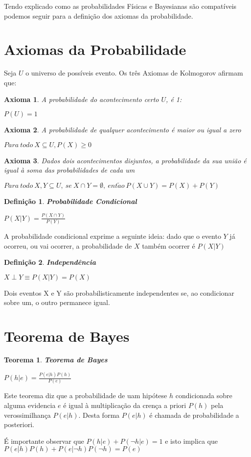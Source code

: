 Tendo explicado como as probabilidades Físicas e Bayesianas são compatíveis podemos seguir para a definição dos axiomas da probabilidade. 

\section{Axiomas da Probabilidade}
Seja $U$ o universo de possíveis evento. Os três Axiomas de Kolmogorov \cite{kolmogorov33} afirmam que:

\newtheorem{kolg1}{Axioma}[chapter]
\newtheorem{kolg2}[kolg1]{Axioma}
\newtheorem{kolg3}[kolg1]{Axioma}
\begin{kolg1}
	A probabilidade do acontecimento certo $U$, é 1:
	
	\centering $P(U) = 1$
\end{kolg1}
 

\begin{kolg2}
	A probabilidade de qualquer acontecimento é maior ou igual a zero 
	
	\centering $Para\ todo\ X \subseteq U, P(X) \ge 0$
\end{kolg2}


\begin{kolg3}
	Dados dois acontecimentos disjuntos, a probabilidade da sua união é igual à soma das probabilidades de cada um 
	
	\centering $Para\ todo\ X, Y \subseteq U,\ se\ X \cap Y = \emptyset,\ ent\tilde{a}o\ P(X \cup Y) = P(X) + P(Y)$
\end{kolg3}

\newtheorem{cond_prob}{Definição}[chapter]
\begin{cond_prob}
	\textbf{Probabilidade Condicional}
	
	\centering $P(X|Y) = \frac{P(X \cap Y)}{P(Y)}$
\end{cond_prob}
A probabilidade condicional exprime a seguinte ideia: dado que o evento $Y$ já ocorreu, ou vai ocorrer, a probabilidade de $X$ também ocorrer é $P(X|Y)$

\newtheorem{independence}[cond_prob]{Definição}
\begin{independence}
	\textbf{Independência}

	\centering	$X \perp Y \equiv P(X|Y) = P(X)$
\end{independence}
Dois eventos X e Y são probabilisticamente independentes se, ao condicionar sobre um, o outro permanece igual.

\section{Teorema de Bayes}
\newtheorem{bayes}{Teorema}[chapter]
\begin{bayes}
	\textbf{Teorema de Bayes}
	
	\centering $P(h|e) = \frac{P(e|h)P(h)}{P(e)}$
\end{bayes}
Este teorema diz que a probabilidade de uam hipótese $h$ condicionada sobre alguma evidencia $e$ é igual à multiplicação da crença a priori $P(h)$ pela verossimilhança $P(e|h)$. Desta forma $P(e|h)$ é chamada de probabilidade a posteriori.

É importante observar que $P(h|e)+P(\neg  h|e) = 1$ e isto implica que $P(e|h)P(h) +P(e|\neg h)P(\neg h)= P(e)$

